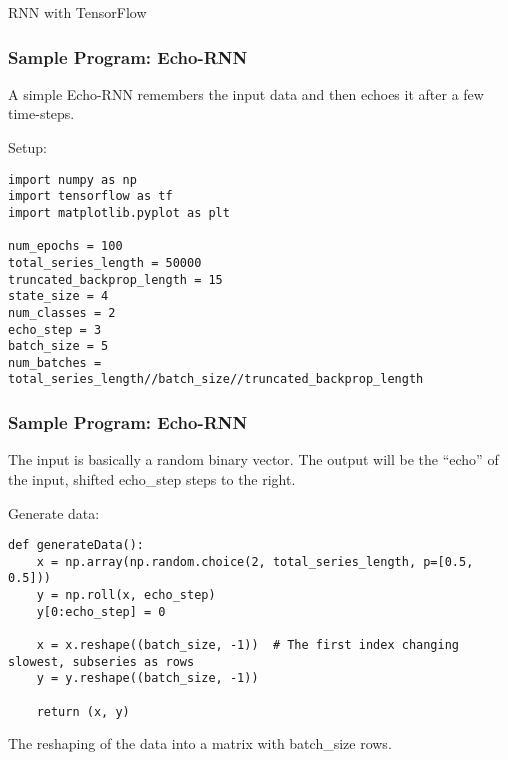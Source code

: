 \begin{frame}
  \begin{center}
    {\Large RNN with TensorFlow}
    
  \end{center}
\end{frame}

\begin{frame}[fragile] \frametitle{Sample Program: Echo-RNN}
A simple Echo-RNN remembers the input data and then echoes it after a few time-steps. 

Setup:

\begin{lstlisting}
import numpy as np
import tensorflow as tf
import matplotlib.pyplot as plt

num_epochs = 100
total_series_length = 50000
truncated_backprop_length = 15
state_size = 4
num_classes = 2
echo_step = 3
batch_size = 5
num_batches = total_series_length//batch_size//truncated_backprop_length
\end{lstlisting}

\end{frame}

\begin{frame}[fragile] \frametitle{Sample Program: Echo-RNN}

The input is basically a random binary vector. The output will be the ``echo'' of the input, shifted echo\_step steps to the right.

Generate data:
\begin{lstlisting}
def generateData():
    x = np.array(np.random.choice(2, total_series_length, p=[0.5, 0.5]))
    y = np.roll(x, echo_step)
    y[0:echo_step] = 0

    x = x.reshape((batch_size, -1))  # The first index changing slowest, subseries as rows
    y = y.reshape((batch_size, -1))

    return (x, y)
\end{lstlisting}
The reshaping of the data into a matrix with batch\_size rows.
\end{frame}


